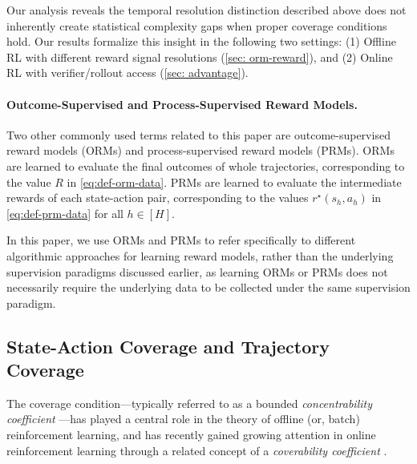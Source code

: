 \documentclass{article}
\let\oldparagraph\paragraph
\renewcommand{\paragraph}[1]{\oldparagraph{#1.}}
\begin{document}
Our analysis reveals the temporal resolution distinction described above does not inherently create statistical complexity gaps when proper coverage conditions hold. Our results formalize this insight in the following two settings: (1) Offline RL with different reward signal resolutions (\cref{sec: orm-reward}), and (2) Online RL with verifier/rollout access (\cref{sec: advantage}).









\paragraph{Outcome-Supervised and Process-Supervised Reward Models}

Two other commonly used terms related to this paper are outcome-supervised reward models (ORMs) and process-supervised reward models (PRMs). ORMs are learned to evaluate the final outcomes of whole trajectories, corresponding to the value $R$ in \cref{eq:def-orm-data}. PRMs are learned to evaluate the intermediate rewards of each state-action pair, corresponding to the values $r^\star(s_h,a_h)$ in \cref{eq:def-prm-data} for all $h\in [H]$.

In this paper, we use ORMs and PRMs to refer specifically to different algorithmic approaches for learning reward models, rather than the underlying supervision paradigms discussed earlier, as learning ORMs or PRMs does not necessarily require the underlying data to be collected under the same supervision paradigm.



\subsection{State-Action Coverage and Trajectory Coverage}\label{sec: prem-concentrability}

The coverage condition---typically referred to as a bounded \emph{concentrability coefficient} \citep{munos2003error,antos2008learning,farahmand2010error,chen2019information,jin2021pessimism,xie2021batch,xie2021bellman,bhardwaj2023adversarial}---has played a central role in the theory of offline (or, batch) reinforcement learning, and has recently gained growing attention in online reinforcement learning through a related concept of a \emph{coverability coefficient} \citep{xie2022role,liu2023can,amortila2024harnessing,amortila2024scalable}.
\end{document}
